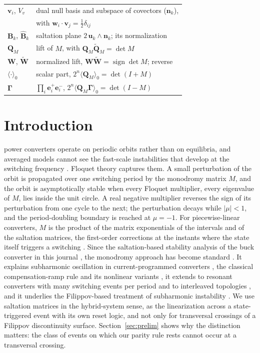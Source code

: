 \documentclass[journal]{IEEEtran}
\newcommand{\rev}[1]{\widetilde{#1}}
\newcommand{\sgn}{\operatorname{sign}}
\begin{document}
\begin{table}[!t]
\begin{tabular}{@{}ll@{}}
$\bm{v}_i$, $V_v$ & dual null basis and subspace of covectors ($\bm{n}_k$), \\
           & with $\bm{w}_i\!\cdot\!\bm{v}_j=\tfrac12\delta_{ij}$ \\
$\bm{B}_k$, $\hat{\bm{B}}_k$ & saltation plane $2\,\bm{u}_k\wedge\bm{n}_k$;
                               its normalization \\
$\bm{Q}_M$ & lift of $M$, with $\bm{Q}_M\rev{\bm{Q}}_M=\det M$ \\
$\bm{W}$, $\rev{\bm{W}}$ & normalized lift, $\bm{W}\rev{\bm{W}}=\sgn\det M$; reverse \\
$\langle\cdot\rangle_0$ & scalar part, $2^n\langle\bm{Q}_M\rangle_0=\det(I+M)$ \\
$\bm{\Gamma}$ & $\prod_i\bm{e}^{+}_i\bm{e}^{-}_i$, $2^n\langle\bm{Q}_M\bm{\Gamma}\rangle_0=\det(I-M)$ \\
\bottomrule
\end{tabular}
\end{table}

\section{Introduction}
 power converters operate on periodic orbits rather
than on equilibria, and averaged models cannot see the fast-scale
instabilities that develop at the switching frequency
\cite{deane1990instability,banerjee2001nonlinear}. Floquet theory captures
them. A small perturbation of the orbit is propagated over one switching
period by the monodromy matrix $M$, and the orbit is asymptotically stable
when every Floquet multiplier, every eigenvalue of $M$, lies inside the unit
circle. A real negative multiplier reverses the sign of its perturbation from
one cycle to the next; the perturbation decays while $\lvert\mu\rvert<1$, and
the period-doubling boundary is reached at $\mu=-1$. For piecewise-linear
converters, $M$ is the product of the matrix exponentials of the intervals and
of the saltation matrices, the first-order corrections at the instants where
the state itself triggers a switching
\cite{aizerman1958,muller1995,leine2004,kong2024saltation}. Since the
saltation-based stability analysis of the buck converter in this journal
\cite{giaouris2008stability}, the monodromy approach has become standard
\cite{elaroudi2015review}. It explains subharmonic oscillation in
current-programmed converters \cite{elaroudi2021analytical}, the classical
compensation-ramp rule \cite{deane1990instability,erickson2020fundamentals}
and its nonlinear variants \cite{elaroudi2020piecewise}, it extends to
resonant converters with many switching events per period
\cite{mandal2013symmetry} and to interleaved topologies
\cite{wu2014interleaved}, and it underlies the Filippov-based treatment of
subharmonic instability \cite{giaouris2009filippov}. We use saltation matrices in the hybrid-system
sense, as the linearization across a state-triggered event with its own reset
logic, and not only for transversal crossings of a Filippov discontinuity
surface. Section~\ref{sec:prelim} shows why the distinction matters: the
class of events on which our parity rule rests cannot occur at a transversal
crossing.
\end{document}
